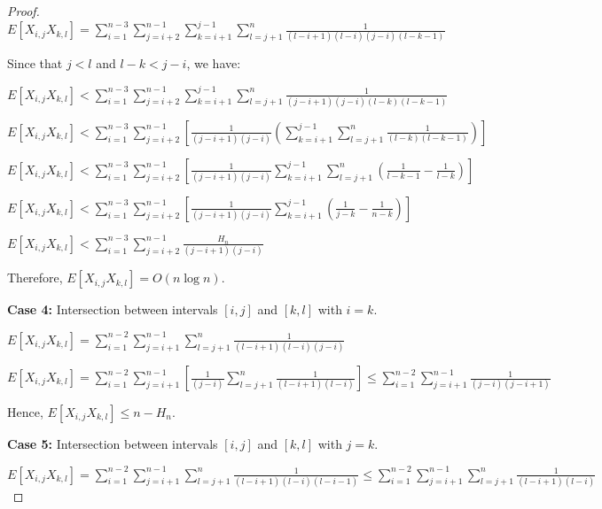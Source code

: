 \documentclass[12pt]{article}
\begin{document}
\begin{proof}
$E[X_{i,j} X_{k,l}] = \sum\limits_{i=1}^{n-3} \sum\limits_{j=i+2}^{n-1}
\sum\limits_{k=i+1}^{j-1} \sum\limits_{l=j+1}^{n} \frac{1}{(l-i+1)(l-i)(j-i)(l-k-1)}$


Since that $j < l$ and $ l - k < j - i$, we have:

$E[X_{i,j} X_{k,l}] < \sum\limits_{i=1}^{n-3} \sum\limits_{j=i+2}^{n-1}
\sum\limits_{k=i+1}^{j-1} \sum\limits_{l=j+1}^{n} \frac{1}{(j-i+1)(j-i)(l-k)(l-k-1)}$

$E[X_{i,j} X_{k,l}] < \sum\limits_{i=1}^{n-3} \sum\limits_{j=i+2}^{n-1}
\left[ \frac{1}{(j-i+1)(j-i)}  \left( \sum\limits_{k=i+1}^{j-1} \sum\limits_{l=j+1}^{n} \frac{1}{(l-k)(l-k-1)} \right) \right]$

$E[X_{i,j} X_{k,l}] < \sum\limits_{i=1}^{n-3} \sum\limits_{j=i+2}^{n-1}
\left[ \frac{1}{(j-i+1)(j-i)}  \sum\limits_{k=i+1}^{j-1} \sum\limits_{l=j+1}^{n}  \left(  \frac{1}{l-k-1} - \frac{1}{l-k}  \right) \right]$

$E[X_{i,j} X_{k,l}] < \sum\limits_{i=1}^{n-3} \sum\limits_{j=i+2}^{n-1}
\left[ \frac{1}{(j-i+1)(j-i)}  \sum\limits_{k=i+1}^{j-1}  \left(  \frac{1}{j-k} - \frac{1}{n-k}  \right) \right]$

$E[X_{i,j} X_{k,l}] < \sum\limits_{i=1}^{n-3} \sum\limits_{j=i+2}^{n-1}
\frac{H_{n}}{(j-i+1)(j-i)} $

Therefore, $E[X_{i,j} X_{k,l}] = O(n \log n)$.

\vspace{0.5cm}

{\bf Case 4:} Intersection between intervals $[i, j]$ and $[k, l]$ with $i = k$.

$E[X_{i,j} X_{k,l}] = \sum\limits_{i=1}^{n-2}
\sum\limits_{j=i+1}^{n-1} \sum\limits_{l=j+1}^{n} \frac{1}{(l-i+1)(l-i)(j-i)}$

$E[X_{i,j} X_{k,l}] = \sum\limits_{i=1}^{n-2}
\sum\limits_{j=i+1}^{n-1} \left[ \frac{1}{(j-i)} \sum\limits_{l=j+1}^{n} \frac{1}{(l-i+1)(l-i)} \right]
\leq \sum\limits_{i=1}^{n-2}
\sum\limits_{j=i+1}^{n-1} \frac{1}{(j-i)(j-i+1)}$

Hence, $E[X_{i,j} X_{k,l}] \leq n - H_{n}$.

\vspace{0.5cm}

{\bf Case 5:} Intersection between intervals $[i, j]$ and $[k, l]$ with $j = k$.

$E[X_{i,j} X_{k,l}] = \sum\limits_{i=1}^{n-2}
\sum\limits_{j=i+1}^{n-1} \sum\limits_{l=j+1}^{n} \frac{1}{(l-i+1)(l-i)(l-i-1)}
\leq \sum\limits_{i=1}^{n-2}
\sum\limits_{j=i+1}^{n-1} \sum\limits_{l=j+1}^{n} \frac{1}{(l-i+1)(l-i)}
$


\end{proof}
\end{document}
